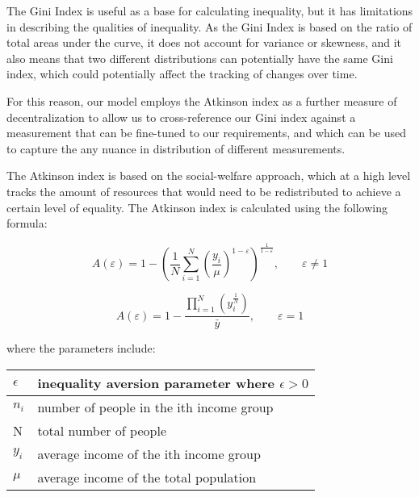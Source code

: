 \documentclass[conference]{IEEEtran}
\begin{document}
The Gini Index is useful as a base for calculating inequality, but it has limitations in describing the qualities of inequality.  As the Gini Index is based on the ratio of total areas under the curve, it does not account for variance or skewness, and it also means that two different distributions can potentially have the same Gini index, which could potentially affect the tracking of changes over time.

For this reason, our model employs the Atkinson index \cite{atkinson1970measurement} as a further measure of decentralization to allow us to cross-reference our Gini index against a measurement that can be fine-tuned to our requirements, and which can be used to capture the any nuance in distribution of different measurements.

The Atkinson index is based on the social-welfare approach, which at a high level tracks the amount of resources that would need to be redistributed to achieve a certain level of equality.  The Atkinson index is calculated using the following formula:

\[A(\varepsilon) = 1 - \left(\frac{1}{N} \sum_{i=1}^{N} \left(\frac{y_i}{\mu}\right)^{1 - \varepsilon}\right)^{\frac{1}{1 - \varepsilon}}, \quad \quad \varepsilon \neq 1
\]

\[A\left( \varepsilon \right)=1-\frac{\prod_{i=1}^{N}\left( y_{i}^{\frac{1}{N}} \right)}{\bar{y}}, \quad \quad \varepsilon=1\]

\vspace{12pt}

where the parameters include:

\vspace{12pt}

\begin{center}
\begin{tabular}{|l|l|}
\hline
$\epsilon$ & inequality aversion parameter where $\epsilon>0$ \\ \hline
$n_{i}$ & number of people in the ith income group \\ \hline
N & total number of people \\ \hline
$y_{i}$ & average income of the ith income group \\ \hline
$\mu$ & average income of the total population \\ \hline
\end{tabular}
\end{center}

\vspace{12pt}
\end{document}
